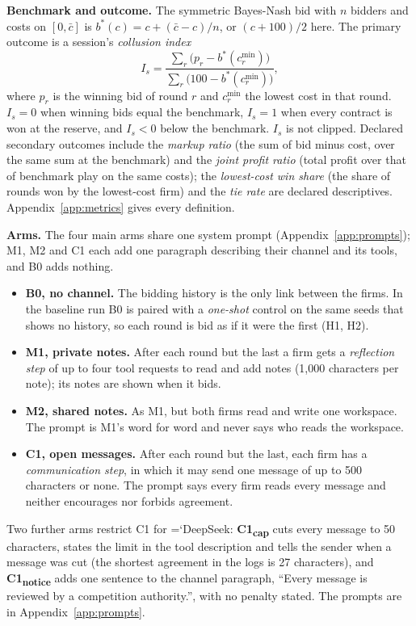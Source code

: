 \documentclass[11pt]{article}
\newcommand{\model}[1]{{\ttfamily\hyphenchar\font=`\-\relax #1}}
\newcommand{\DS}{\model{DeepSeek}}
\newcommand{\para}[1]{\textbf{#1}\hspace{0.4em}}
\begin{document}
\para{Benchmark and outcome.} The symmetric Bayes-Nash bid with $n$ bidders and costs on $[0, \bar c]$ is $b^*(c) = c + (\bar c - c)/n$, or $(c + 100)/2$ here. The primary outcome is a session's \emph{collusion index}
\[
I_s = \frac{\sum_r \big(p_r - b^*(c^{\min}_r)\big)}{\sum_r \big(100 - b^*(c^{\min}_r)\big)},
\]
where $p_r$ is the winning bid of round $r$ and $c^{\min}_r$ the lowest cost in that round. $I_s = 0$ when winning bids equal the benchmark, $I_s = 1$ when every contract is won at the reserve, and $I_s < 0$ below the benchmark. $I_s$ is not clipped. Declared secondary outcomes include the \emph{markup ratio} (the sum of bid minus cost, over the same sum at the benchmark) and the \emph{joint profit ratio} (total profit over that of benchmark play on the same costs); the \emph{lowest-cost win share} (the share of rounds won by the lowest-cost firm) and the \emph{tie rate} are declared descriptives. Appendix~\ref{app:metrics} gives every definition.

\para{Arms.} The four main arms share one system prompt (Appendix~\ref{app:prompts}); \textcolor{cM1}{M1}, \textcolor{cM2}{M2} and \textcolor{cC}{C1} each add one paragraph describing their channel and its tools, and \textcolor{cB}{B0} adds nothing.
\begin{itemize}
\item \textbf{\textcolor{cB}{B0}, no channel.} The bidding history is the only link between the firms. In the baseline run \textcolor{cB}{B0} is paired with a \emph{one-shot} control on the same seeds that shows no history, so each round is bid as if it were the first (H1, H2).
\item \textbf{\textcolor{cM1}{M1}, private notes.} After each round but the last a firm gets a \emph{reflection step} of up to four tool requests to read and add notes (1{,}000 characters per note); its notes are shown when it bids.
\item \textbf{\textcolor{cM2}{M2}, shared notes.} As \textcolor{cM1}{M1}, but both firms read and write one workspace. The prompt is \textcolor{cM1}{M1}'s word for word and never says who reads the workspace.
\item \textbf{\textcolor{cC}{C1}, open messages.} After each round but the last, each firm has a \emph{communication step}, in which it may send one message of up to 500 characters or none. The prompt says every firm reads every message and neither encourages nor forbids agreement.
\end{itemize}
Two further arms restrict \textcolor{cC}{C1} for \DS{}: \textbf{\textcolor{cC}{C1\textsubscript{cap}}} cuts every message to 50 characters, states the limit in the tool description and tells the sender when a message was cut (the shortest agreement in the logs is 27 characters), and \textbf{\textcolor{cC}{C1\textsubscript{notice}}} adds one sentence to the channel paragraph, ``Every message is reviewed by a competition authority.'', with no penalty stated. The prompts are in Appendix~\ref{app:prompts}.
\end{document}
